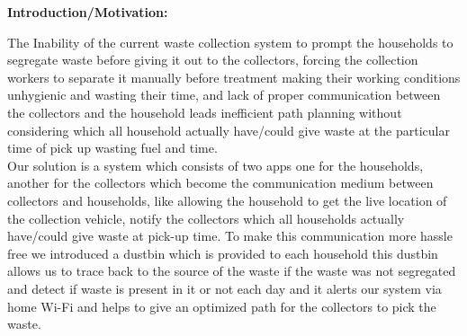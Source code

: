 \textup{\huge {\bf Introduction/Motivation: } \\[0.90in] }

\large  {The Inability of the current waste collection system to prompt the households to segregate waste before giving it out to the collectors, forcing the collection workers to separate it manually before treatment making their working conditions unhygienic and wasting their time, and lack of proper communication between the collectors and the household leads inefficient path planning without considering which all household actually have/could give waste at the particular time of pick up wasting fuel and time.}\\[0.3in]

\large  {Our solution is a system which consists of two apps one for the households, another for the collectors which become the communication medium between collectors and households, like allowing the household to get the live location of the collection vehicle, notify the collectors which all households actually have/could give waste at pick-up time. To make this communication more hassle free we introduced a dustbin which is provided to each household this dustbin allows us to trace back to the source of the waste if the waste was not segregated and detect if waste is present in it or not each day and it alerts our system via home Wi-Fi and helps to give an optimized path for the collectors to pick the waste.}\\[0.3in]
\newpage